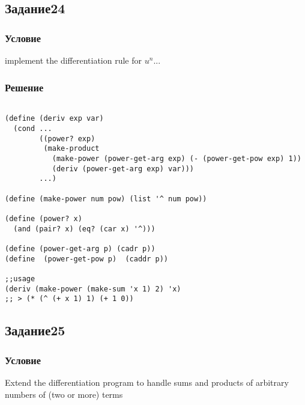 \documentclass[10pt,a4paper]{article}
\begin{document}
\subsection*{Задание24}
\subsubsection*{Условие}
implement the differentiation rule for $u^n$... 
\subsubsection*{Решение}
\begin{lstlisting}

(define (deriv exp var)
  (cond ...
        ((power? exp)
         (make-product
           (make-power (power-get-arg exp) (- (power-get-pow exp) 1))
           (deriv (power-get-arg exp) var)))
        ...)

(define (make-power num pow) (list '^ num pow))

(define (power? x)
  (and (pair? x) (eq? (car x) '^)))

(define (power-get-arg p) (cadr p))
(define  (power-get-pow p)  (caddr p))

;;usage
(deriv (make-power (make-sum 'x 1) 2) 'x) 
;; > (* (^ (+ x 1) 1) (+ 1 0))

\end{lstlisting}

\subsection*{Задание25}
\subsubsection*{Условие}
Extend the differentiation program to handle sums and products of arbitrary numbers of (two or more) terms
\end{document}
